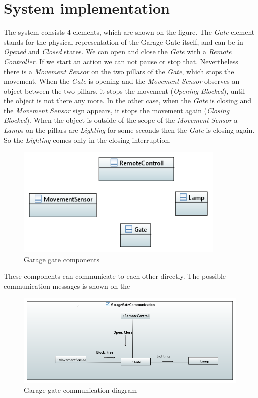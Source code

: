 \section{System implementation}

The system consists  4 elements, which are shown on the  figure. The \textit{Gate} element stands for the physical representation of the Garage Gate itself, and can be in \textit{Opened} and \textit{Closed} states. We can open and close the \textit{Gate} with a \textit{Remote Controller}. If we start an action we can not pause or stop that. Nevertheless there is a \textit{Movement Sensor} on the two pillars of the \textit{Gate}, which stops the movement. When the \textit{Gate} is opening and the \textit{Movement Sensor} observes an object between the two pillars, it stops the movement (\textit{Opening Blocked}), until the object is not there any more. In the other case, when the \textit{Gate} is closing and the \textit{Movement Sensor} sign appears, it stops the movement again (\textit{Closing Blocked}). When the object is outside of the scope of the \textit{Movement Sensor} a \textit{Lamp}s on the pillars are \textit{Lighting} for some seconds then the \textit{Gate} is closing again.
So the \textit{Lighting} comes only in the closing interruption.

\begin{figure}[!ht]
	\centering
	\includegraphics[width=100mm, keepaspectratio]{figures/component.png}
	\caption{Garage gate components}
	\label{fig:Garage Component}
\end{figure}

These components can communicate to each other directly. The possible communication messages is shown on the 

\begin{figure}[!ht]
	\centering
	\includegraphics[width=150mm, keepaspectratio]{figures/communication.png}
	\caption{Garage gate communication diagram}
	\label{fig:Garage communication}
\end{figure}

